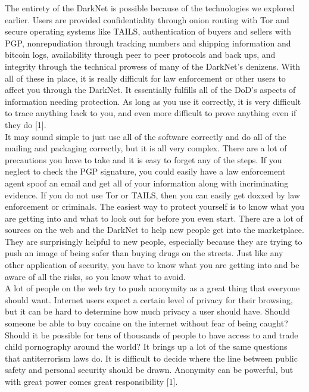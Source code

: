 \documentclass[twocolumn,letterpaper,10pt]{article}
\begin{document}
The entirety of the DarkNet is possible because of the technologies we explored earlier. Users are provided confidentiality through onion routing with Tor and secure operating systems like TAILS, authentication of buyers and sellers with PGP, non­repudiation through tracking numbers and shipping information and bitcoin logs, availability through peer to peer protocols and back ups, and integrity through the technical prowess of many of the DarkNet's denizens. With all of these in place, it is really difficult for law enforcement or other users to affect you through the DarkNet. It essentially fulfills all of the DoD's aspects of information needing protection. As long as you use it correctly, it is very difficult to trace anything back to you, and even more difficult to prove anything even if they do [1].\\
\indent It may sound simple to just use all of the software correctly and do all of the mailing and packaging correctly, but it is all very complex. There are a lot of precautions you have to take and it is easy to forget any of the steps. If you neglect to check the PGP signature, you could easily have a law enforcement agent spoof an email and get all of your information along with incriminating evidence. If you do not use Tor or TAILS, then you can easily get doxxed by law enforcement or criminals. The easiest way to protect yourself is to know what you are getting into and what to look out for before you even start. There are a lot of sources on the web and the DarkNet to help new people get into the marketplace. They are surprisingly helpful to new people, especially because they are trying to push an image of being safer than buying drugs on the streets. Just like any other application of security, you have to know what you are getting into and be aware of all the risks, so you know what to avoid.\\
\indent A lot of people on the web try to push anonymity as a great thing that everyone should want. Internet users expect a certain level of privacy for their browsing, but it can be hard to determine how much privacy a user should have. Should someone be able to buy cocaine on the internet without fear of being caught? Should it be possible for tens of thousands of people to have access to and trade child pornography around the world? It brings up a lot of the same questions that anti­terrorism laws do. It is difficult to decide where the line between public safety and personal security should be drawn. Anonymity can be powerful, but with great power comes great responsibility [1].
\end{document}
